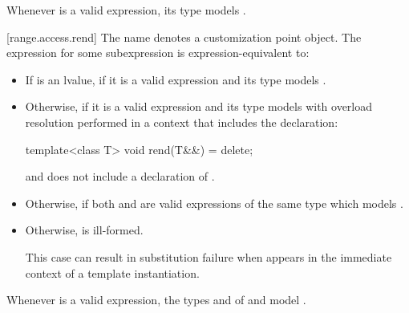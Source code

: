 \pnum
\begin{note}
Whenever  is a valid expression, its type models
.
\end{note}

[range.access.rend]{}
\pnum
The name  denotes a customization point
object. The expression
 for some subexpression  is
expression-equivalent to:

\begin{itemize}
\item
  If  is an lvalue, 
  if it is a valid expression and its type  models
  .

\item
  Otherwise,  if it is a valid
  expression and its type  models
   with overload
  resolution performed in a context that includes the declaration:
  \begin{codeblock}
  template<class T> void rend(T&&) = delete;
  \end{codeblock}

  and does not include a declaration of .

\item
  Otherwise,  if both
   and  are valid
  expressions of the same type  which models
  .

\item
  Otherwise,  is ill-formed.
  \begin{note}
  This case can result in substitution failure when 
  appears in the immediate context of a template instantiation.
  \end{note}
\end{itemize}

\pnum
\begin{note}
Whenever  is a valid expression,
the types  and  of
 and 
model .
\end{note}

